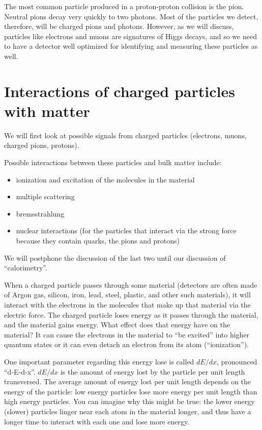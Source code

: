 The most common particle produced in a proton-proton collision is the pion.  Neutral pions decay very quickly to two photons. Most of the particles we detect, therefore, will be charged pions and photons.  However, as we will discuss, particles like electrons and muons are signatures of Higgs decays, and so we need to have a detector well optimized for identifying and measuring these particles as well.




\section{Interactions of charged particles with matter}
We will first look at possible signals from charged particles (electrons, muons, charged pions, protons).

Possible interactions between these particles and bulk matter include:
\begin{itemize}
\item ionization and excitation of the molecules in the material
\item multiple scattering
\item bremsstrahlung
\item nuclear interactions (for the particles that interact via the strong force because they contain quarks, the pions and protons)
\end{itemize}
We will postphone the discussion of the last two until our discussion of ``calorimetry''.

When a charged particle passes through some material (detectors are often made of Argon gas, silicon, iron, lead, steel, plastic, and other such materials), it will interact with the electrons in the molecules that make up that material via the electric force.  The charged particle loses energy as it passes through the material, and the material gains energy.  What effect does that energy have on the material?  It can cause the electrons in the material to ``be excited'' into higher quantum states or it can even detach an electron from its atom (``ionization'').  

One important parameter regarding this energy lose is called $dE/dx$, pronounced ``d-E-d-x''.  $dE/dx$ is the amount of energy lost by the particle per unit length transversed.  The average amount of energy lost per unit length depends on the energy of the particle: low energy particles lose more energy per unit length than high energy particles.  You can imagine why this might be true: the lower energy (slower) particles linger near each atom in the material longer, and thus have a longer time to interact with each one and lose more energy.

